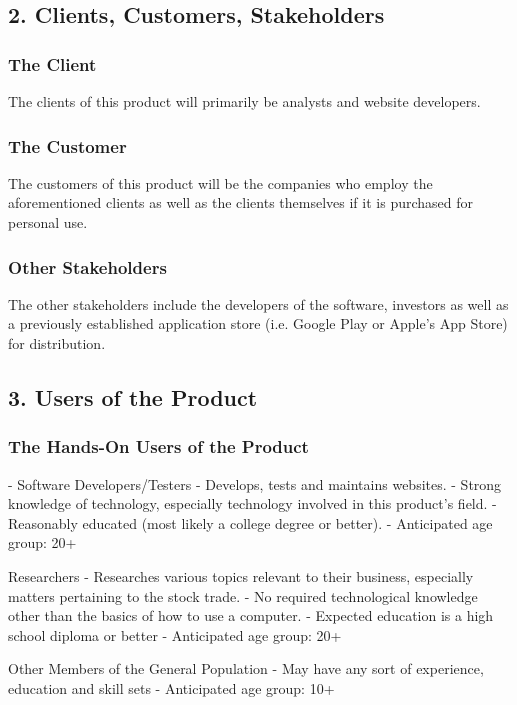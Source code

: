 \documentclass[titlepage]{article}
\begin{document}
\subsection{2. Clients, Customers, Stakeholders}

\subsubsection*{The Client}
The clients of this product will primarily be analysts and website developers.

\subsubsection*{The Customer}
The customers of this product will be the companies who employ the aforementioned clients as well as the clients themselves if it is purchased for personal use.

\subsubsection*{Other Stakeholders}
The other stakeholders include the developers of the software, investors as well as a previously established application store (i.e. Google Play or Apple’s App Store) for distribution.

\subsection{3. Users of the Product}

\subsubsection*{The Hands-On Users of the Product}
- Software Developers/Testers
- Develops, tests and maintains websites.
- Strong knowledge of technology, especially technology involved in this product’s field.
- Reasonably educated (most likely a college degree or better).
- Anticipated age group: 20+

Researchers
- Researches various topics relevant to their business, especially matters pertaining to the stock trade.
- No required technological knowledge other than the basics of how to use a computer.
- Expected education is a high school diploma or better
- Anticipated age group: 20+

Other Members of the General Population
- May have any sort of experience, education and skill sets
- Anticipated age group: 10+
\end{document}
